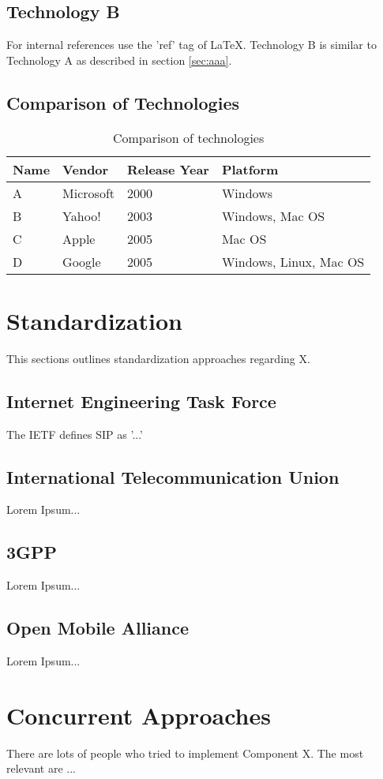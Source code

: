 \subsection{Technology B\label{sec:bbb}}

For internal references use the 'ref' tag of LaTeX. Technology B is similar to Technology A as described in section \ref{sec:aaa}.

\newpage

\subsection{Comparison of Technologies\label{sec:comp}}

\begin{table}[htb]
\centering
\begin{tabular}[t]{|l|l|l|l|}
\hline
Name & Vendor & Release Year & Platform \\
\hline
\hline
A & Microsoft & 2000 & Windows \\
\hline
B & Yahoo! & 2003 & Windows, Mac OS \\
\hline
C & Apple & 2005 & Mac OS \\
\hline
D & Google & 2005 & Windows, Linux, Mac OS \\
\hline
\end{tabular}
\caption{Comparison of technologies}
\label{tab:enghistory}
\end{table}

\section{Standardization \label{sec:standard}}

This sections outlines standardization approaches regarding X.

\subsection{Internet Engineering Task Force\label{sec:ietf}}

The IETF defines SIP as '...' \cite{rfcsip}

\subsection{International Telecommunication Union\label{sec:itu}}

Lorem Ipsum...

\subsection{3GPP\label{sec:3gpp}}

Lorem Ipsum...

\subsection{Open Mobile Alliance\label{sec:oma}}

Lorem Ipsum...

\section{Concurrent Approaches \label{sec:summ}}

There are lots of people who tried to implement Component X. The most relevant are ...